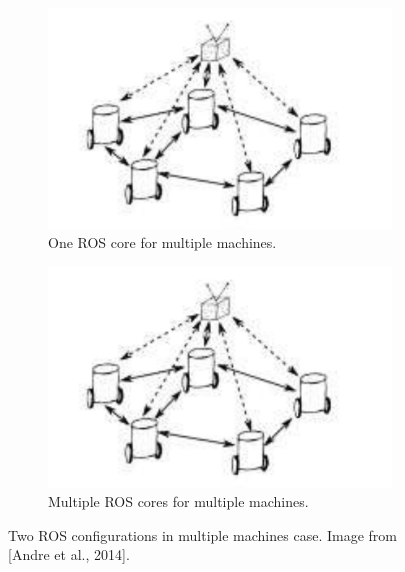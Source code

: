 \documentclass[11pt,openany]{book}
\begin{document}
\begin{figure}[H]
    \centering
    \begin{subfigure}[H]{0.4\linewidth}
        \includegraphics[width=\linewidth]{assets/4_8_a.png}
        \caption{{One ROS core for multiple machines.}}
        \label{fig:4.8a}
    \end{subfigure}
    \begin{subfigure}[H]{0.4\linewidth}
        \includegraphics[width=\linewidth]{assets/4_8_a.png}
        \caption{{Multiple ROS cores for multiple machines.}}
        \label{fig:4.8b}
    \end{subfigure}
    \caption{{Two ROS conﬁgurations in multiple machines case. Image from [Andre et al., 2014].}}
    \label{fig:4.8}
\end{figure}
\end{document}
